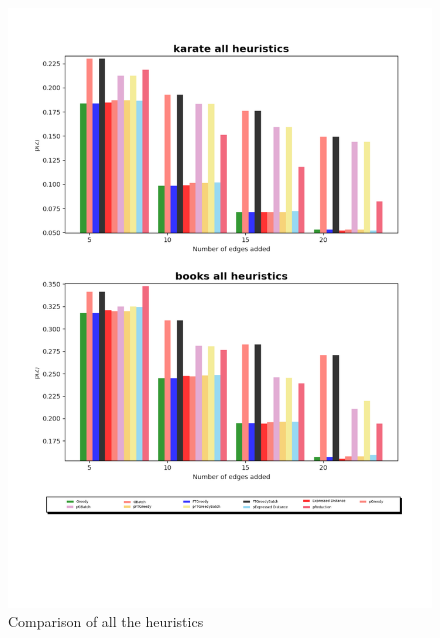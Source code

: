 \begin{figure}[!htbp]
	\begin{center}
	\advance\leftskip-1.3cm
	\captionsetup{justification=centering,margin=2cm}
	\includegraphics[width=1\textwidth]{Figures/all1}
	\caption{Comparison of all the heuristics}
	\end{center}
	\label{all1}
\end{figure}

\clearpage

